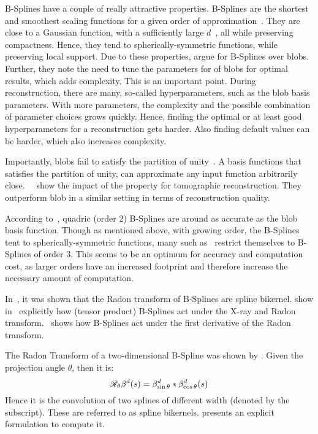 B-Splines have a couple of really attractive properties. B-Splines are the shortest and smoothest
scaling functions for a given order of approximation~\cite{momey_b-spline_2012}. They are close to a
Gaussian function, with a sufficiently large \(d\)~\cite{momey_b-spline_2012}, all while preserving
compactness. Hence, they tend to spherically-symmetric functions, while preserving local support.
Due to these properties, \citeauthor*{momey_new_2011}\cite{momey_new_2011} argue for B-Splines over
blobs. Further, they note the need to tune the parameters for of blobs for optimal results, which
adds complexity. This is an important point. During reconstruction, there are many, so-called
hyperparameters, such as the blob basis parameters. With more parameters, the complexity and the
possible combination of parameter choices grows quickly. Hence, finding the optimal or at least good
hyperparameters for a reconstruction gets harder. Also finding default values can be harder, which
also increases complexity.

Importantly, blobs fail to satisfy the partition of unity~\cite{nilchian_fast_2013}. A basis
functions that satisfies the partition of unity, can approximate any input function arbitrarily
close.~\citeauthor*{nilchian_fast_2013}~\cite{nilchian_fast_2013} show the impact of the property
for tomographic reconstruction. They outperform blob in a similar setting in terms of reconstruction
quality.

According to~\cite{momey_spline_2015}, quadric (order \(2\)) B-Splines are around as accurate as the
blob basis function. Though as mentioned above, with growing order, the B-Splines tent to
spherically-symmetric functions, many such
as~\cite{momey_new_2011,momey_b-spline_2012,momey_spline_2015, nilchian_fast_2013} restrict
themselves to B-Splines of order \(3\). This seems to be an optimum for accuracy and computation
cost, as larger orders have an increased footprint and therefore increase the necessary amount of
computation.

In~\cite{horbelt_discretization_2002}, it was shown that the Radon transform of B-Splines are spline
bikernel. \citeauthor*{entezari_box_2012} show in~\cite{entezari_box_2012} explicitly how (tensor
product) B-Splines act under the X-ray and Radon transform.~\cite{nilchian_differential_2012} shows
how B-Splines act under the first derivative of the Radon transform.

The Radon Transform of a two-dimensional B-Spline was shown by
\citeauthor*{horbelt_discretization_2002}\cite{horbelt_discretization_2002}. Given the projection
angle \(\theta\), then it is:
\begin{equation}
	\mathscr{R}_\theta\beta^d(s) = \beta^d_{\sin\theta} * \beta^d_{\cos\theta}(s)
\end{equation}
Hence it is the convolution of two splines of different width (denoted by the subscript). These are
referred to as spline bikernels. \citeauthor*{horbelt_discretization_2002} presents an explicit
formulation to compute it.

